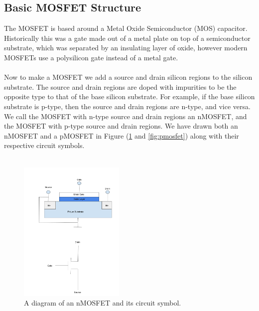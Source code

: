 \documentclass[
  reprint,
  amsmath,amssymb,
  aps
]{revtex4-1}
\begin{document}
\subsection{\label{sec:level2}Basic MOSFET Structure}
The MOSFET is based around a Metal Oxide Semiconductor (MOS) capacitor. Historically this 
was a gate made out of a metal plate on top of a semiconductor substrate, which was separated by an insulating layer of oxide, however modern 
MOSFETs use a polysilicon gate instead of a metal gate.\\\\
Now to make a MOSFET we add a source and drain silicon regions to the silicon substrate. The source and drain regions are doped with impurities to
be the opposite type to that of the base silicon substrate. For example, if the base silicon substrate is p-type, then the source and drain regions
are n-type, and vice versa. We call the MOSFET with n-type source and drain regions an nMOSFET, and the MOSFET with p-type source and drain regions. We have 
drawn both an nMOSFET and a pMOSFET in Figure (\ref{fig:nmosfet} and \ref{fig:pmosfet}) along with their respective circuit symbols.\\\\
\begin{figure}[H]
    \centering
        \includegraphics[width=0.45\textwidth]{nmosfet.png}
    \caption{A diagram of an nMOSFET and its circuit symbol.}
    \label{fig:nmosfet}
\end{figure}
\end{document}
